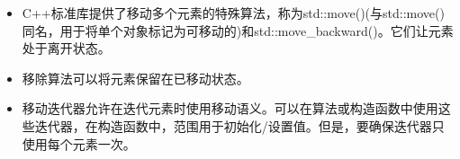 \begin{itemize}
	\item C++标准库提供了移动多个元素的特殊算法，称为std::move()(与std::move()同名，用于将单个对象标记为可移动的)和std::move\_backward()。它们让元素处于离开状态。
	\item 移除算法可以将元素保留在已移动状态。
	\item 移动迭代器允许在迭代元素时使用移动语义。可以在算法或构造函数中使用这些迭代器，在构造函数中，范围用于初始化/设置值。但是，要确保迭代器只使用每个元素一次。
\end{itemize}


\newpage